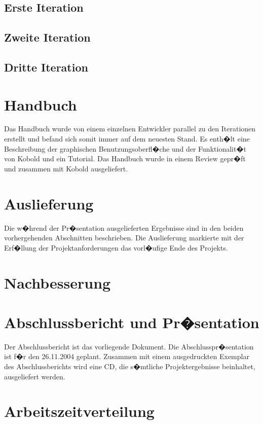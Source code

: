 \documentclass[a4paper,titlepage,12pt,ngerman]{scrbook}
\begin{document}
\subsection{Erste Iteration}
\subsection{Zweite Iteration}
\subsection{Dritte Iteration}

\section{Handbuch}
Das Handbuch wurde von einem einzelnen Entwickler parallel zu den Iterationen 
erstellt und befand sich somit immer auf dem neuesten Stand. Es enth�lt eine 
Beschreibung der graphischen Benutzungsoberfl�che und der Funktionalit�t 
von Kobold und ein Tutorial. Das Handbuch wurde in einem Review gepr�ft und
zusammen mit Kobold ausgeliefert.


\section{Auslieferung}
Die w�hrend der Pr�sentation ausgelieferten Ergebnisse sind in den
beiden vorhergehenden Abschnitten beschrieben. Die Auslieferung
markierte mit der Erf�llung der Projektanforderungen das vorl�ufige
Ende des Projekts.

\section{Nachbesserung}

\section{Abschlussbericht und Pr�sentation}
Der Abschlussbericht ist das vorliegende Dokument. Die
Abschlusspr�sentation ist f�r den 26.11.2004 geplant. Zusammen
mit einem ausgedruckten Exemplar des Abschlussberichts wird eine CD, die
s�mtliche Projektergebnisse beinhaltet, ausgeliefert werden.


\section{Arbeitszeitverteilung}
\end{document}
